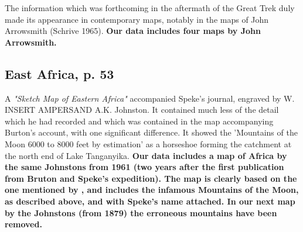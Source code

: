 \documentclass[12pt]{article}
\begin{document}
The information which was forthcoming in the aftermath of the Great Trek duly
made its appearance in contemporary maps, notably in the maps of John Arrowsmith
(Schrive 1965). \textbf{Our data includes four maps by John Arrowsmith.}

\subsection{East Africa, p. 53}

A \textit{"Sketch Map of Eastern Africa"} accompanied Speke's journal, engraved
by W. INSERT AMPERSAND A.K. Johnston. It contained much less of the detail which
he had recorded and which was contained in the map accompanying Burton's
account, with one significant difference. It showed the 'Mountains of the Moon
6000 to 8000 feet by estimation' as a horseshoe forming the catchment at the
north end of Lake Tanganyika.  \textbf{Our data includes a map of Africa by the
	same Johnstons from 1961 (two years after the first publication from
	Bruton and Speke's expedition). The map is clearly based on the one
	mentioned by \citet{Stone1995}, and includes the infamous Mountains of
	the Moon, as described above, and with Speke's name attached. In our
next map by the Johnstons (from 1879) the erroneous mountains have been
removed.}

\pagebreak



\end{document}
